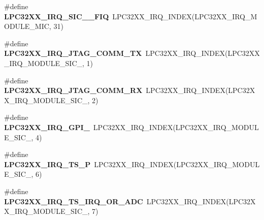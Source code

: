\begin{DoxyCompactItemize}
\item 
\mbox{\label{group__lpc32xx__interrupt_gabef8705ec4dcf84cfef313d8df7b04ca}} 
\#define {\bfseries L\+P\+C32\+X\+X\+\_\+\+I\+R\+Q\+\_\+\+S\+I\+C\+\_\+\_\+\+F\+IQ}~L\+P\+C32\+X\+X\+\_\+\+I\+R\+Q\+\_\+\+I\+N\+D\+EX(L\+P\+C32\+X\+X\+\_\+\+I\+R\+Q\+\_\+\+M\+O\+D\+U\+L\+E\+\_\+\+M\+IC, 31)
\item 
\mbox{\label{group__lpc32xx__interrupt_gaaa081d38620c6001844bba4462051cd4}} 
\#define {\bfseries L\+P\+C32\+X\+X\+\_\+\+I\+R\+Q\+\_\+\+J\+T\+A\+G\+\_\+\+C\+O\+M\+M\+\_\+\+TX}~L\+P\+C32\+X\+X\+\_\+\+I\+R\+Q\+\_\+\+I\+N\+D\+EX(L\+P\+C32\+X\+X\+\_\+\+I\+R\+Q\+\_\+\+M\+O\+D\+U\+L\+E\+\_\+\+S\+I\+C\+\_, 1)
\item 
\mbox{\label{group__lpc32xx__interrupt_ga82d1f990dcbe1c6c0d2a41a2777145d0}} 
\#define {\bfseries L\+P\+C32\+X\+X\+\_\+\+I\+R\+Q\+\_\+\+J\+T\+A\+G\+\_\+\+C\+O\+M\+M\+\_\+\+RX}~L\+P\+C32\+X\+X\+\_\+\+I\+R\+Q\+\_\+\+I\+N\+D\+EX(L\+P\+C32\+X\+X\+\_\+\+I\+R\+Q\+\_\+\+M\+O\+D\+U\+L\+E\+\_\+\+S\+I\+C\+\_, 2)
\item 
\mbox{\label{group__lpc32xx__interrupt_gac86837f835daf2dc1e2510a052e70521}} 
\#define {\bfseries L\+P\+C32\+X\+X\+\_\+\+I\+R\+Q\+\_\+\+G\+P\+I\+\_}~L\+P\+C32\+X\+X\+\_\+\+I\+R\+Q\+\_\+\+I\+N\+D\+EX(L\+P\+C32\+X\+X\+\_\+\+I\+R\+Q\+\_\+\+M\+O\+D\+U\+L\+E\+\_\+\+S\+I\+C\+\_, 4)
\item 
\mbox{\label{group__lpc32xx__interrupt_ga2ed7c88733711c01fe659f0b46530690}} 
\#define {\bfseries L\+P\+C32\+X\+X\+\_\+\+I\+R\+Q\+\_\+\+T\+S\+\_\+P}~L\+P\+C32\+X\+X\+\_\+\+I\+R\+Q\+\_\+\+I\+N\+D\+EX(L\+P\+C32\+X\+X\+\_\+\+I\+R\+Q\+\_\+\+M\+O\+D\+U\+L\+E\+\_\+\+S\+I\+C\+\_, 6)
\item 
\mbox{\label{group__lpc32xx__interrupt_ga66798c68dd69b78cffa2d57665b43a15}} 
\#define {\bfseries L\+P\+C32\+X\+X\+\_\+\+I\+R\+Q\+\_\+\+T\+S\+\_\+\+I\+R\+Q\+\_\+\+O\+R\+\_\+\+A\+DC}~L\+P\+C32\+X\+X\+\_\+\+I\+R\+Q\+\_\+\+I\+N\+D\+EX(L\+P\+C32\+X\+X\+\_\+\+I\+R\+Q\+\_\+\+M\+O\+D\+U\+L\+E\+\_\+\+S\+I\+C\+\_, 7)
\item 
\mbox{\label{group__lpc32xx__interrupt_ga9aa41b049dc3c45d534a75a4138649e2}} 

\end{DoxyCompactItemize}
